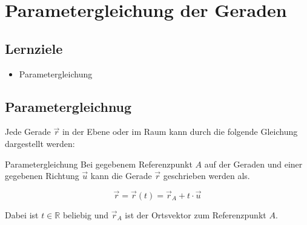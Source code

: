\section{Parametergleichung der Geraden}

\subsection*{Lernziele}
\begin{itemize}
\item Parametergleichung
\end{itemize}



\TALSTadBFWG{}{}
\newpage

\subsection{Parametergleichnug}
Jede Gerade $\vec{r}$ in der Ebene oder im Raum kann durch die
folgende Gleichung dargestellt werden:

\begin{definition}{Parametergleichung}{}
  Bei gegebenem Referenzpunkt $A$ auf der Geraden und einer gegebenen
  Richtung $\vec{u}$ kann die Gerade $\vec{r}$ geschrieben werden als.
  
  $$\vec{r} = \vec{r}(t) = \vec{r}_A + t\cdot{} \vec{u}$$

  Dabei ist $t\in\mathbb{R}$ beliebig und $\vec{r}_A$ ist der
  Ortsvektor zum Referenzpunkt $A$.
\end{definition}

